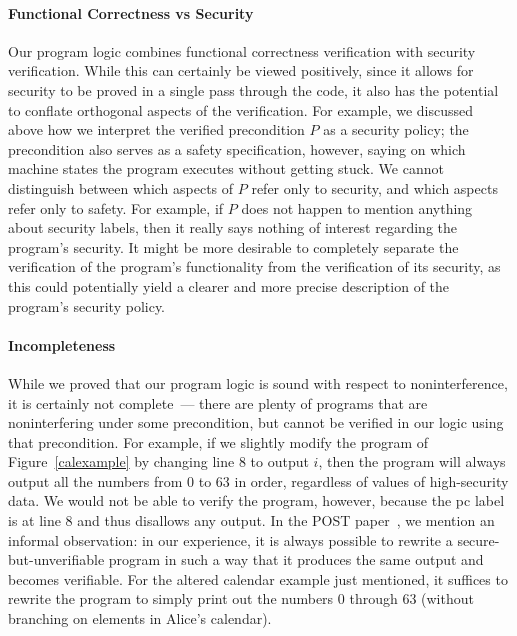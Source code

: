 \paragraph{Functional Correctness vs Security}
Our program logic combines functional correctness verification with security
verification. While this can certainly be viewed positively, since it allows
for security to be proved in a single pass through the code, it also has
the potential to conflate orthogonal aspects of the verification. For example,
we discussed above how we interpret the verified precondition $P$ as a security
policy; the precondition also serves as a safety specification, however, saying
on which machine states the program executes without getting stuck. We cannot
distinguish between which aspects of $P$ refer only to security, and which 
aspects refer only to safety. For example, if $P$ does not happen to mention 
anything about security labels, then it really says nothing of interest 
regarding the program's security. It might be more desirable to completely
separate the verification of the program's functionality from the
verification of its security, as this could potentially yield a clearer
and more precise description of the program's security policy.

\paragraph{Incompleteness}
While we proved that our program logic is sound with respect to noninterference,
it is certainly not complete~--- there are plenty of programs that are 
noninterfering under some precondition, but cannot be verified in our 
logic using that precondition. For example, if we slightly modify the program of 
Figure~\ref{calexample} by changing line 8 to output $i$,
then the program will always output all the numbers from 0 to 63 in order, regardless of
values of high-security data. We would not be able to verify the program, however, because
the pc label is \hi{} at line 8 and thus disallows any output. In the POST 
paper~\cite{costanzo-ddifc}, 
we mention an informal observation: in our experience, it is always possible to rewrite a 
secure-but-unverifiable program in such a way that it produces the same output and 
becomes verifiable. For the altered calendar example just mentioned, it suffices to 
rewrite the program to simply print out the numbers 0 through 63 (without branching on 
elements in Alice's calendar).

